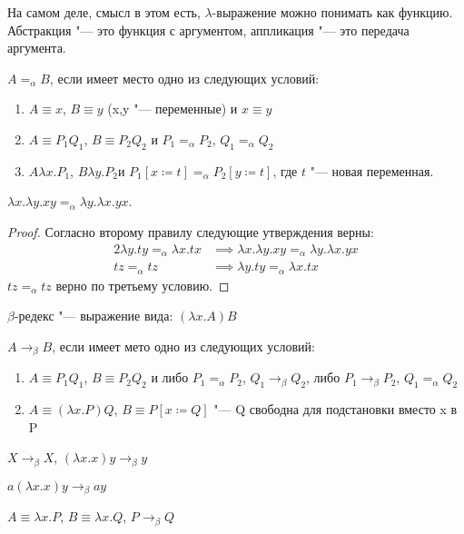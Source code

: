 На самом деле, смысл в этом есть, $\lambda$-выражение можно понимать как функцию.
Абстракция "--- это функция с аргументом, аппликация "--- это передача аргумента.

\begin{definition}
	$A=_{\alpha}B$, если имеет место одно из следующих условий:
	\begin{enumerate}
		\item $A\equiv{}x$, $B\equiv{}y$ (x,y "--- переменные) и $x\equiv{}y$
		\item $A\equiv{}P_{1}Q_{1}$, $B\equiv{}P_{2}Q_{2}$ и $P_{1}=_{\alpha}P_{2}$, $Q_{1}=_{\alpha}Q_{2}$
		\item $A\lambda{}x.P_{1}$, $B\lambda{}y.P_{2}$и $P_{1} [x\coloneqq{}t] =_{\alpha}P_2 [y\coloneqq{}t]$, где $t$ "--- новая переменная.
	\end{enumerate} 
\end{definition}

\begin{example}
	$\lambda{}x.\lambda{}y.xy=_{\alpha}\lambda{}y.\lambda{}x.yx$.
	\begin{proof} Согласно второму правилу следующие утверждения верны:
		\begin{alignat*}{2}
		\lambda{}y.ty=_{\alpha}\lambda{}x.tx &\implies \lambda{}x.\lambda{}y.xy=_{\alpha}\lambda{}y.\lambda{}x.yx \\
		tz=_{\alpha}tz &\implies \lambda{}y.ty=_{\alpha}\lambda{}x.tx
		\end{alignat*}%
		$tz=_{\alpha}tz$ верно по третьему условию.
	\end{proof}
\end{example}

\begin{definition}
	$\beta$-редекс "--- выражение вида: $\left(\lambda{}x.A\right)B$
\end{definition}

\begin{definition}
	$A\to_{\beta}B$, если имеет мето одно из следующих условий:
	\begin{enumerate}
		\item $A\equiv{}P_{1}Q_{1}$, $B\equiv{}P_{2}Q_{2}$ и либо $P_{1}=_{\alpha}P_{2}$, $Q_{1}\to_{\beta}Q_{2}$, либо
		$P_{1}\to_{\beta}P_{2}$, $Q_{1}=_{\alpha}Q_{2}$
		\item $A\equiv\left(\lambda{}x.P\right) Q$, $B\equiv P[x\coloneqq{}Q]$ "--- Q свободна для подстановки вместо x в P 
	\end{enumerate}
	\begin{example} 
		$X\to_{\beta}X$, $\left(\lambda{}x.x\right) y\to_{\beta} y$
	\end{example}
	\begin{example}
		 $a \left(\lambda{}x.x\right) y\to_{\beta} a y$
	\end{example}
	\begin{example}
		$A\equiv\lambda{}x.P$, $B\equiv\lambda{}x.Q$, $P\to_{\beta}Q$
	\end{example}
\end{definition}

